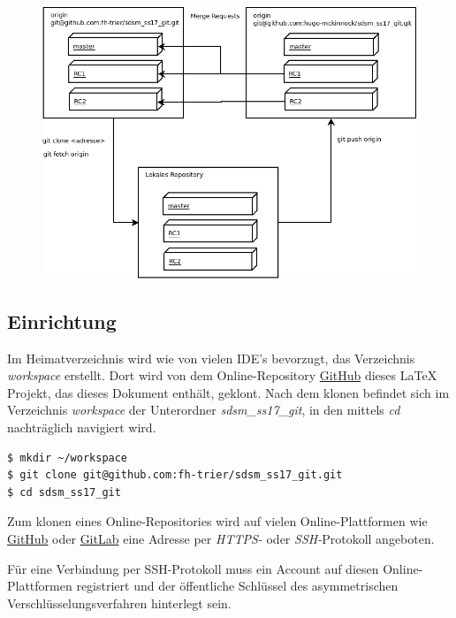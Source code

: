 \begin{figure}[h]
  \centering
  \includegraphics[width=1\textwidth]{img//workflow.png}
  \label{img:workflow}
\end{figure}  

\subsection{Einrichtung}
Im Heimatverzeichnis wird wie von vielen IDE's bevorzugt, das Verzeichnis \textit{workspace} erstellt. Dort wird von dem Online-Repository \href{https://github.com}{GitHub} dieses \LaTeX{} Projekt, das dieses Dokument enthält, geklont. Nach dem klonen befindet sich im Verzeichnis \textit{workspace} der Unterordner \textit{sdsm\_ss17\_git}, in den mittels \textit{cd} nachträglich navigiert wird.

\begin{verbatim}
$ mkdir ~/workspace
$ git clone git@github.com:fh-trier/sdsm_ss17_git.git
$ cd sdsm_ss17_git
\end{verbatim}

\begin{INFO}
  Zum klonen eines Online-Repositories wird auf vielen Online-Plattformen wie \href{https://github.com}{GitHub} oder \href{https://gitlab.com}{GitLab} eine Adresse per \textit{HTTPS-} oder \textit{SSH-}Protokoll angeboten. 
  
  Für eine Verbindung per SSH-Protokoll muss ein Account auf diesen Online-Plattformen registriert und der öffentliche Schlüssel des asymmetrischen Verschlüsselungsverfahren hinterlegt sein.  
\end{INFO}

